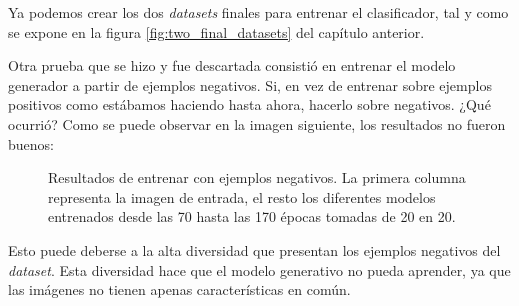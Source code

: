 Ya podemos crear los dos \textit{datasets} finales para entrenar el clasificador, tal y como se expone en la figura \ref{fig:two_final_datasets} del capítulo anterior.

Otra prueba que se hizo y fue descartada consistió en entrenar el modelo generador a partir de ejemplos negativos. Si, en vez de entrenar sobre ejemplos positivos como estábamos haciendo hasta ahora, hacerlo sobre negativos. ¿Qué ocurrió? Como se puede observar en la imagen siguiente, los resultados no fueron buenos:

\begin{figure}[H]
\centering
    \caption{Resultados de entrenar con ejemplos negativos. La primera columna representa la imagen de entrada, el resto los diferentes modelos entrenados desde las 70 hasta las 170 épocas tomadas de 20 en 20.}
\end{figure}

Esto puede deberse a la alta diversidad que presentan los ejemplos negativos del \textit{dataset}. Esta diversidad hace que el modelo generativo no pueda aprender, ya que las imágenes no tienen apenas características en común.


